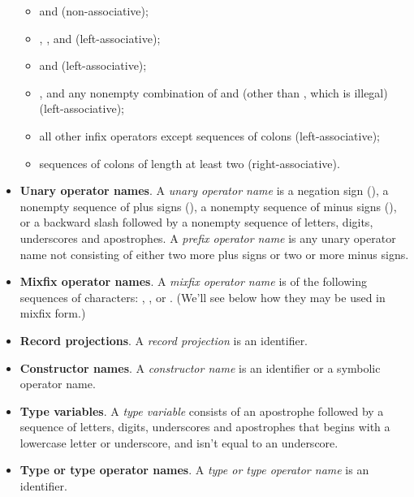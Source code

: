 \begin{itemize}
\begin{itemize}
  \item \ecn{=} and \ecn{<>} (non-associative);

  \item \ecn{<}, \ecn{>}, \ecn{<=} and \ecn{>=}
    (left-associative);

  \item \ecn{-} and \ecn{+} (left-associative);

  \item \ecn{*}, and any nonempty combination of \ecn{/} and
    \ecn{\%} (other than \ecn{//}, which is illegal)
    (left-associative);

  \item all other infix operators except sequences of colons
    (left-associative);

  \item sequences of colons of length at least two (right-associative).
  \end{itemize}

\item \textbf{Unary operator names}. A \emph{unary operator name} is a
  negation sign (\ec{!}), a nonempty sequence of plus signs (\ec{+}),
  a nonempty sequence of minus signs (\ec{-}), or a backward slash
  followed by a nonempty sequence of letters, digits, underscores and
  apostrophes.  A \emph{prefix operator name} is any unary operator
  name not consisting of either two more plus signs or two or more
  minus signs.

\item \textbf{Mixfix operator names}. A \emph{mixfix operator name} is
  of the following sequences of characters: , \ec{[]},
   or .  (We'll see below how they may be used
  in mixfix form.)

\item \textbf{Record projections}. A \emph{record projection} is an
  identifier.

\item \textbf{Constructor names}. A \emph{constructor name} is an identifier
  or a symbolic operator name.

\item \textbf{Type variables}. A \emph{type variable} consists of an
  apostrophe followed by a sequence of letters, digits, underscores
  and apostrophes that begins with a lowercase letter or underscore,
  and isn't equal to an underscore.

\item \textbf{Type or type operator names}. A \emph{type or type
  operator name} is an identifier.


\end{itemize}
